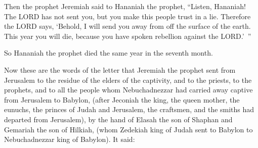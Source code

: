 \myverse{}Then the prophet Jeremiah said to Hananiah the prophet, “Listen, Hananiah! The LORD has not sent you, but you make this people trust in a lie. \myverse{}Therefore the LORD says, ‘Behold, I will send you away from off the surface of the earth. This year you will die, because you have spoken rebellion against the LORD.’ ”


\myverse{}So Hananiah the prophet died the same year in the seventh month.


\mychapter{} \myverse*{}Now these are the words of the letter that Jeremiah the prophet sent from Jerusalem to the residue of the elders of the captivity, and to the priests, to the prophets, and to all the people whom Nebuchadnezzar had carried away captive from Jerusalem to Babylon, \myverse{}(after Jeconiah the king, the queen mother, the eunuchs, the princes of Judah and Jerusalem, the craftsmen, and the smiths had departed from Jerusalem), \myverse{}by the hand of Elasah the son of Shaphan and Gemariah the son of Hilkiah, (whom Zedekiah king of Judah sent to Babylon to Nebuchadnezzar king of Babylon). It said:


